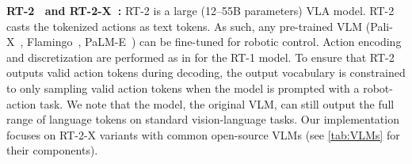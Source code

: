 \noindent\textbf{ RT-2~\cite{rt-2} and RT-2-X~\cite{9}:} RT-2 is a large (12--55B parameters) VLA model.%
RT-2 casts the tokenized actions as text tokens.
As such, any pre-trained VLM (\eg Pali-X~\cite{chen2023palix}, Flamingo~\cite{alayrac2022flamingo}, {P}a{LM}-E~\cite{driess2023palme}) can be fine-tuned for robotic control.%
Action encoding and discretization are performed as in \cite{rt-1} for the RT-1 model. 
To ensure that RT-2 outputs valid action tokens during decoding, the output vocabulary is
constrained to only sampling valid action tokens when the model is prompted with a robot-action task.
We note that the model, \ie the original VLM, can still output the full range of language tokens on standard vision-language tasks.
Our implementation focuses on RT-2-X variants with common open-source VLMs (see \autoref{tab:VLMs} for their components). 
